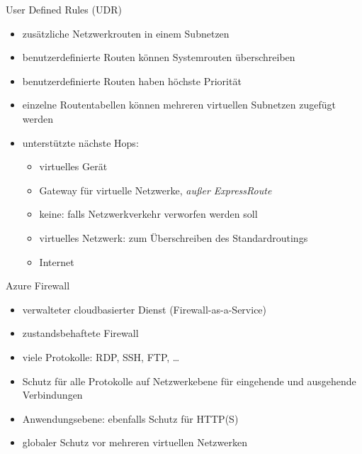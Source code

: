 \begin{flashcard}[Definition]{User Defined Rules (UDR)}
    \begin{itemize}
        \item zusätzliche Netzwerkrouten in einem Subnetzen
        \item benutzerdefinierte Routen können Systemrouten überschreiben
        \item benutzerdefinierte Routen haben höchste Priorität
        \item einzelne Routentabellen können mehreren virtuellen Subnetzen zugefügt werden
        \item unterstützte nächste Hops:
        \begin{itemize}
            \item virtuelles Gerät
            \item Gateway für virtuelle Netzwerke, \emph{außer ExpressRoute}
            \item keine: falls Netzwerkverkehr verworfen werden soll
            \item virtuelles Netzwerk: zum Überschreiben des Standardroutings
            \item Internet
        \end{itemize}

    \end{itemize}

\end{flashcard}

\begin{flashcard}[Definition]{Azure Firewall}
    \begin{itemize}
        \item verwalteter cloudbasierter Dienst (Firewall-as-a-Service)
        \item zustandsbehaftete Firewall
        \item viele Protokolle: RDP, SSH, FTP, \ldots
        \item Schutz für alle Protokolle auf Netzwerkebene für eingehende und ausgehende Verbindungen
        \item Anwendungsebene: ebenfalls Schutz für HTTP(S)
        \item globaler Schutz vor mehreren virtuellen Netzwerken
    \end{itemize}

\end{flashcard}

